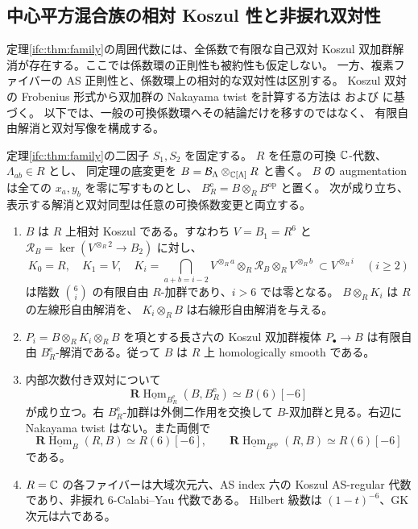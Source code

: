 \subsection{中心平方混合族の相対 Koszul 性と非捩れ双対性}
\label{ifr:subsec:regularity}

定理\ref{ifc:thm:family}の周囲代数には、全係数で有限な自己双対
Koszul 双加群解消が存在する。ここでは係数環の正則性も被約性も仮定しない。
一方、複素ファイバーの AS 正則性と、係数環上の相対的な双対性は区別する。
Koszul 双対の Frobenius 形式から双加群の Nakayama twist を計算する方法は
\cite[Theorem~6.3, Proposition~6.4]{IFRBergerMarconnet}および
\cite[Lemmas~1.1--1.2]{IFRHeVanOystaeyenZhang}に基づく。
以下では、一般の可換係数環へその結論だけを移すのではなく、
有限自由解消と双対写像を構成する。

\begin{theorem}
\label{ifr:thm:ambient-regularity}
定理\ref{ifc:thm:family}の二因子 $S_1,S_2$ を固定する。
$R$ を任意の可換 $\mathbb C$-代数、$\Lambda_{ab}\in R$ とし、
同定理の底変更を $B=\mathcal B_\Lambda\otimes_{\mathbb C[\Lambda]}R$ と書く。
$B$ の augmentation は全ての $x_a,y_b$ を零に写すものとし、
$B_R^{\mathrm e}=B\otimes_R B^{\mathrm{op}}$ と置く。
次が成り立ち、表示する解消と双対同型は任意の可換係数変更と両立する。
\begin{enumerate}
 \item $B$ は $R$ 上相対 Koszul である。すなわち $V=B_1=R^6$ と
 $\mathcal R_B=\ker(V^{\otimes_R2}\to B_2)$ に対し、
 \[
 K_0=R,\quad K_1=V,\quad
 K_i=\bigcap_{a+b=i-2}
       V^{\otimes_R a}\otimes_R\mathcal R_B\otimes_RV^{\otimes_R b}
           \ \subset V^{\otimes_R i}\quad(i\ge2)
 \]
 は階数 $\binom6i$ の有限自由 $R$-加群であり、$i>6$ では零となる。
 $B\otimes_RK_i$ は $R$ の左線形自由解消を、
 $K_i\otimes_RB$ は右線形自由解消を与える。
 \item $P_i=B\otimes_RK_i\otimes_RB$ を項とする長さ六の
 Koszul 双加群複体 $P_\bullet\to B$ は有限自由
 $B_R^{\mathrm e}$-解消である。従って $B$ は $R$ 上 homologically smooth である。
 \item 内部次数付き双対について
 \begin{equation}\label{ifr:eq:bimodule-duality}
  \mathbf R\underline{\operatorname{Hom}}_{B_R^{\mathrm e}}
              (B,B_R^{\mathrm e})\simeq B(6)[-6]
 \end{equation}
 が成り立つ。右 $B_R^{\mathrm e}$-加群は外側二作用を交換して
 $B$-双加群と見る。右辺に Nakayama twist はない。また両側で
 \begin{equation}\label{ifr:eq:augmentation-duality}
  \mathbf R\underline{\operatorname{Hom}}_B(R,B)\simeq R(6)[-6],
  \qquad
  \mathbf R\underline{\operatorname{Hom}}_{B^{\mathrm{op}}}(R,B)
                 \simeq R(6)[-6]
 \end{equation}
 である。
 \item $R=\mathbb C$ の各ファイバーは大域次元六、AS index 六の
 Koszul AS-regular 代数であり、非捩れ $6$-Calabi--Yau 代数である。
 Hilbert 級数は $(1-t)^{-6}$、GK 次元は六である。
\end{enumerate}
\end{theorem}

